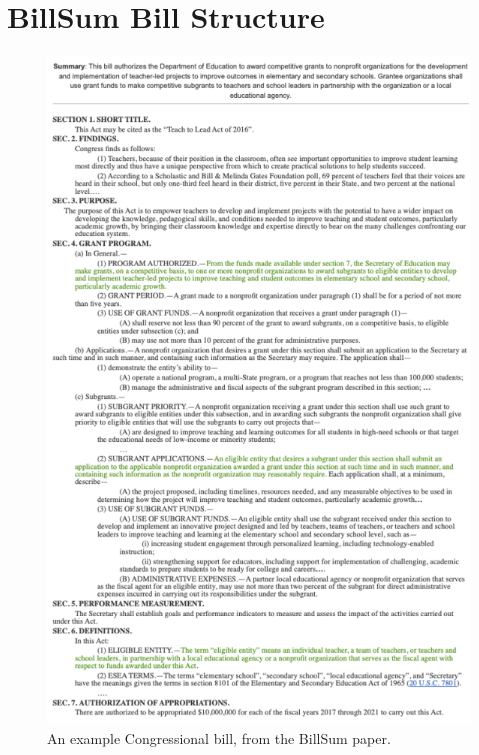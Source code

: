 \documentclass[11pt]{article}
\begin{document}
\section{BillSum Bill Structure}
\label{sec:appendix-a}
\begin{figure}[ht]
  \centering
  \includegraphics[width=\columnwidth]{US_bill.png}  %
  \caption{An example Congressional bill, from the BillSum paper.}
  \label{fig:congressional_bill}
\end{figure}
\end{document}
